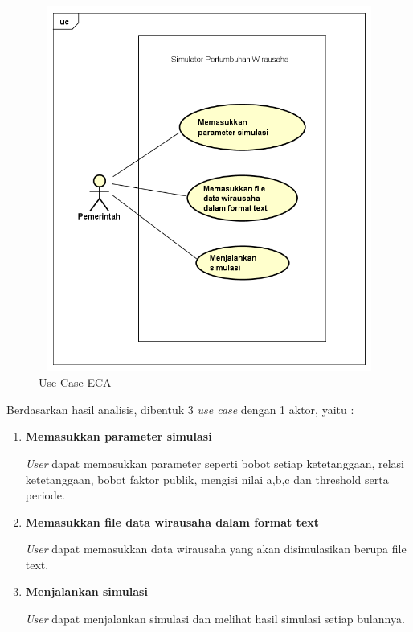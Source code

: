 	\begin{figure} [H]
		\centering  
		\includegraphics[width=14cm, height=12cm]{UseCase2} 
		\caption[Use Case ECA]{Use Case ECA} 
		\label{fig:usecase} 
	\end{figure}
	
Berdasarkan hasil analisis, dibentuk 3 \textit{use case} dengan 1 aktor, yaitu :
\begin{enumerate}
	\item \textbf{Memasukkan parameter simulasi}
	
	\textit{User} dapat memasukkan parameter seperti bobot setiap ketetanggaan, relasi ketetanggaan, bobot faktor publik, mengisi nilai a,b,c dan threshold serta periode.
	\item \textbf{Memasukkan file data wirausaha dalam format text}
	
	\textit{User} dapat memasukkan data wirausaha yang akan disimulasikan berupa file text.
	\item \textbf{Menjalankan simulasi}
	
	\textit{User} dapat menjalankan simulasi dan melihat hasil simulasi setiap bulannya.
\end{enumerate}

